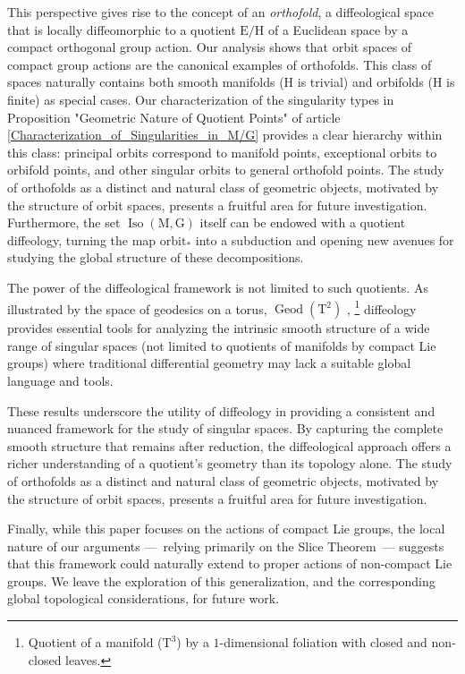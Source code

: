 \documentclass[10pt,reqno,letterpaper,twoside]{amsart}
\theoremstyle{article}
\def \E{\mathrm E}
\def \G{\mathrm G}
\def \H{\mathrm H}
\def \M{\mathrm M}
\def \T{\mathrm T}
\DeclareMathOperator{\Geod}{Geod}
\DeclareMathOperator{\Iso}{Iso}
\newcommand{\orbit}{{\mathrm{orbit}}}
\def \H{\mathrm H} %
\begin{document}
  This perspective gives rise to the concept of an \emph{orthofold},
  a diffeological space that is locally diffeomorphic to a quotient $\E/\H$ of a Euclidean space by a compact orthogonal group action.
  Our analysis shows that orbit spaces of compact group actions are the canonical examples of orthofolds.
  This class of spaces naturally contains both smooth manifolds ($\H$ is trivial) and orbifolds ($\H$ is finite) as special cases.
  Our characterization of the singularity types in Proposition "Geometric Nature of Quotient Points" of article \ref{Characterization_of_Singularities_in_M/G} provides a clear hierarchy within this class:
  principal orbits correspond to manifold points,
  exceptional orbits to orbifold points,
  and other singular orbits to general orthofold points.
  The study of orthofolds as a distinct and natural class of geometric objects,
  motivated by the structure of orbit spaces,
  presents a fruitful area for future investigation.
  Furthermore,
  the set $\Iso(\M,\G)$ itself can be endowed with a quotient diffeology,
  turning the map $\orbit_*$ into a subduction and opening new avenues for studying the global structure of these decompositions.
  
  The power of the diffeological framework is not limited to such quotients.
  As illustrated by the space of geodesics on a torus,
  $\Geod(\T^2)$ \cite[]{PIZ25},%
  \footnote{Quotient of a manifold ($\T^3$) by a $1$-dimensional foliation with closed and non-closed leaves.}
  diffeology provides essential tools for analyzing the intrinsic smooth structure of a wide range of singular spaces
  (not limited to quotients of manifolds by compact Lie groups)
  where traditional differential geometry may lack a suitable global language and tools.
  
  These results underscore the utility of diffeology in providing a consistent and nuanced framework for the study of singular spaces.
  By capturing the complete smooth structure that remains after reduction,
  the diffeological approach offers a richer understanding of a quotient's geometry than its topology alone.
  The study of orthofolds as a distinct and natural class of geometric objects,
  motivated by the structure of orbit spaces,
  presents a fruitful area for future investigation.
  
  Finally,
  while this paper focuses on the actions of compact Lie groups,
  the local nature of our arguments
  ---~relying primarily on the Slice Theorem~---
  suggests that this framework could naturally extend to proper actions of non-compact Lie groups.
  We leave the exploration of this generalization,
  and the corresponding global topological considerations,
  for future work.
  
\end{document}
